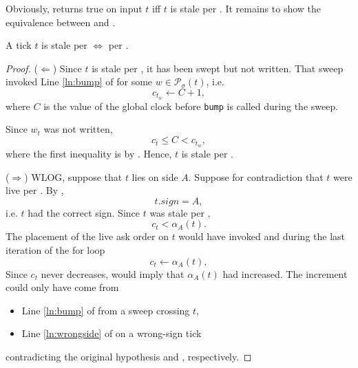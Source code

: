 Obviously,  returns true on input $t$ iff $t$ is stale per . It remains to show the equivalence between  and .
\begin{theorem}[Equivalence] \label{thm:equiv}
    A tick $t$ is stale per  $\iff$ per .
\end{theorem}
\begin{proof}
    ($\Leftarrow$) Since $t$ is stale per , it has been swept but not written. That sweep invoked Line \ref{ln:bump} of  for some $w\in\mathcal{P}_\sigma(t)$, i.e.
    \begin{equation*}
        c_{t_w}\gets C+1,
    \end{equation*}
    where $C$ is the value of the global clock before \texttt{bump} is called during the sweep.
    
    Since $w_t$ was not written,
    \begin{equation*}
        c_t\leq C<c_{t_w},
    \end{equation*}
    where the first inequality is by . Hence, $t$ is stale per .

    ($\Rightarrow$) WLOG, suppose that $t$ lies on side $A$. Suppose for contradiction that $t$ were live per . By ,
    \begin{equation*}
        t.\mathit{sign}=A,
    \end{equation*}
    i.e. $t$ had the correct sign. Since $t$ was stale per ,
    \begin{equation} \label{eqn:contra}
        c_t<\alpha_A(t).
    \end{equation}
    The placement of the live ask order on $t$ would have invoked  and during the last iteration of the for loop
    \begin{equation*}
        c_t\gets\alpha_A(t),
    \end{equation*}
    Since $c_t$ never decreases,  would imply that $\alpha_A(t)$ had increased. The increment could only have come from
    \begin{itemize}
        \item Line \ref{ln:bump} of  from a sweep crossing $t$,
        \item Line \ref{ln:wrongside} of  on a wrong-sign tick 
    \end{itemize}
    contradicting the original hypothesis and , respectively.
\end{proof}